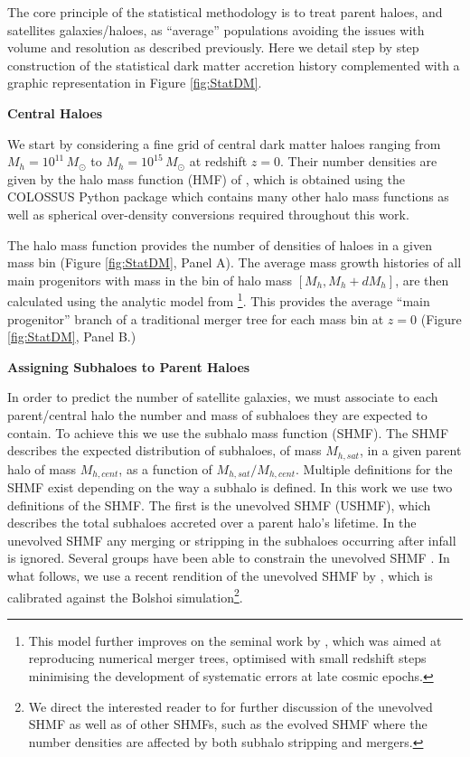 The core principle of the statistical methodology is to treat parent haloes, and satellites galaxies/haloes, as ``average'' populations avoiding the issues with volume and resolution as described previously. Here we detail step by step construction of the statistical dark matter accretion history complemented with a graphic representation in Figure \ref{fig:StatDM}.

\textbf{Central Haloes}

We start by considering a fine grid of central dark matter haloes ranging from $M_{h}=10^{11}\, M_{\odot}$ to $M_{h}=10^{15}\, M_{\odot}$ at redshift $z=0$. Their number densities are given by the halo mass function (HMF) of \citet{Despali2016TheDefinitions}, which is obtained using the COLOSSUS Python package \citep{Diemer2018COLOSSUS:Halos} which contains many other halo mass functions as well as spherical over-density conversions required throughout this work.

The halo mass function provides the number of densities of haloes in a given mass bin (Figure \ref{fig:StatDM}, Panel A).
The average mass growth histories of all main progenitors with mass in the bin of halo mass $[M_{h},M_{h}+dM_{h}]$, are then calculated using the analytic model from \cite{vandenBosch2014ComingWells}\footnote{This model further improves on the seminal work by \citet{Parkinson2008GeneratingTrees}, which was aimed at reproducing numerical merger trees, optimised with small redshift steps minimising the development of systematic errors at late cosmic epochs.}. This provides the average ``main progenitor'' branch of a traditional merger tree for each mass bin at $z = 0$ (Figure \ref{fig:StatDM}, Panel B.)

\textbf{Assigning Subhaloes to Parent Haloes}

In order to predict the number of satellite galaxies, we must associate to each parent/central halo the number and mass of subhaloes they are expected to contain. To achieve this we use the subhalo mass function (SHMF). The SHMF describes the expected distribution of subhaloes, of mass $M_{h,sat}$, in a given parent halo of mass $M_{h,cent}$, as a function of $M_{h,sat}/M_{h,cent}$. Multiple definitions for the SHMF exist depending on the way a subhalo is defined. In this work we use two definitions of the SHMF. The first is the unevolved SHMF (USHMF), which describes the total subhaloes accreted over a parent halo's lifetime. In the unevolved SHMF any merging or stripping in the subhaloes occurring after infall is ignored. Several groups have been able to constrain the unevolved SHMF \citep{Giocoli2008AnalyticalHaloes,Jiang2016StatisticsFunctions}. In what follows, we use a recent rendition of the unevolved SHMF by \citet{Jiang2016StatisticsFunctions}, which is calibrated against the Bolshoi simulation\footnote{We direct the interested reader to \citet{Jiang2016StatisticsFunctions} for further discussion of the unevolved SHMF as well as of other SHMFs, such as the evolved SHMF where the number densities are affected by both subhalo stripping and mergers.}.

